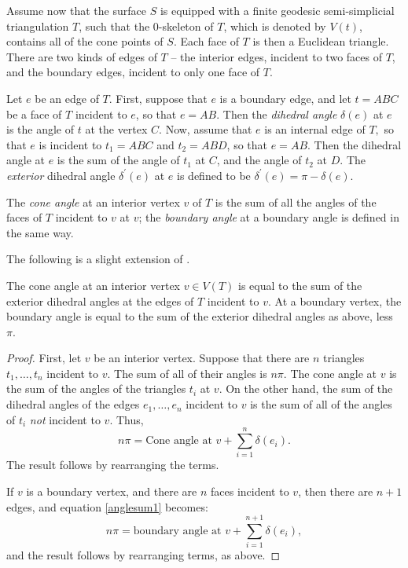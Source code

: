 \documentclass{acmart}
\newcommand{\thm}[2]{\begin{#1} #2 \end{#1}}
\begin{document}
Assume now that the surface $S$ is equipped with a finite geodesic
semi-simplicial triangulation $T$, 
 such that the $0$-skeleton of $T$, which is denoted by $V(t)$,
contains all of the cone points of $S$. Each face of $T$ is then a
Euclidean triangle. There are two kinds of edges of $T$ -- the
interior edges, incident to two faces of $T$, and the boundary
edges, incident to only one face of $T$. 

\thm{definition}
{
\label{dihdef}
Let $e$ be an edge of $T$. First, suppose that
$e$ is a boundary edge, and let $t=ABC$ be a face of $T$ incident
to $e$, so that $e=AB$. Then the \emph{dihedral angle} $\delta(e)$ 
at $e$ is
the angle of $t$ at the vertex $C$. Now, assume that $e$ is an
internal edge of $T,$ so that $e$ is incident to $t_1 = ABC$ and 
$t_2 = ABD$, so that $e = AB.$ Then the dihedral angle at $e$ is
the sum of the angle of $t_1$ at $C$, and the angle of $t_2$ at
$D.$ The \emph{exterior} dihedral angle $\delta^\prime(e)$ at $e$ is
defined to be $\delta^\prime(e) = \pi - \delta(e)$. 

The \emph{cone angle} at an interior vertex $v$ of $T$ is the sum of
all the angles of the faces of $T$ incident to $v$ at $v$; the
\emph{boundary angle} at a boundary angle is defined in the same way. 
}

The following is a slight extension of \cite[Lemma 4.2]{rvol}.

\thm{lemma}
{
\label{cona}
The cone angle at an interior vertex $v\in V(T)$ is equal to the sum of the
exterior dihedral angles at the edges of $T$ incident to $v.$ At a
boundary vertex, the boundary angle is equal to the sum of the
exterior dihedral angles as above, less $\pi$.
}

\thm{proof}
{
First, let $v$ be an interior vertex.
Suppose that there are $n$ triangles $t_1, \dots, t_n$ 
incident to
$v$. The sum of all of their angles is $n \pi.$ The cone angle
at $v$ is the sum of the angles of the triangles $t_i$ at $v.$
On the other hand, the sum of the dihedral angles of the edges
$e_1, \dots, e_n$ 
incident to $v$ is the sum of all of the angles of $t_i$ \emph{not}
incident to $v$. Thus, 
\begin{equation}
\label{anglesum1}
n \pi = \mbox{Cone angle at $v$} + \sum_{i=1}^n \delta(e_i).
\end{equation}
The result follows by rearranging the terms.

If $v$ is a boundary vertex, and there are $n$ faces incident to $v$,
then there are $n+1$ edges, and equation \ref{anglesum1} becomes:
\begin{equation}
\label{anglesum2}
n \pi = \mbox{boundary angle at $v$} + \sum_{i=1}^{n+1} \delta(e_i),
\end{equation}
and the result follows by rearranging terms, as above.
}
\end{document}
